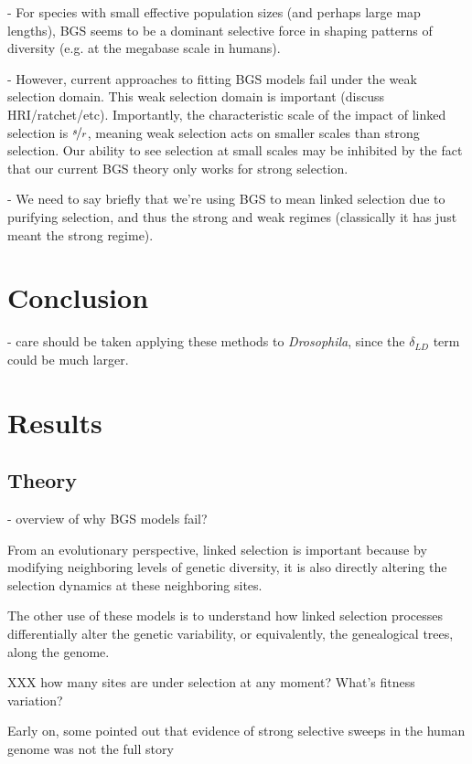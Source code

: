 \documentclass[11pt]{article}
\begin{document}
- For species with small effective population sizes (and perhaps large map
lengths), BGS seems to be a dominant selective force in shaping patterns of
diversity (e.g. at the megabase scale in humans).

- However, current approaches to fitting BGS models fail under the weak
selection domain. This weak selection domain is important (discuss
HRI/ratchet/etc). Importantly, the characteristic scale of the impact of linked
selection is $\nicefrac{s}{r}$, meaning weak selection acts on smaller scales
than strong selection. Our ability to see selection at small scales may be
inhibited by the fact that our current BGS theory only works for strong
selection.

- We need to say briefly that we're using BGS to mean linked selection due to
purifying selection, and thus the strong and weak regimes (classically it has
just meant the strong regime).

\section*{Conclusion}

- care should be taken applying these methods to \emph{Drosophila}, since the
$\delta_{LD}$ term could be much larger.

\section*{Results}

\subsection*{Theory}

- overview of why BGS models fail?


From an evolutionary perspective, linked selection is important because by
modifying neighboring levels of genetic diversity, it is also directly altering
the selection dynamics at these neighboring sites. 


The other use of these models is to understand how linked selection processes
differentially alter the genetic variability, or equivalently, the genealogical
trees, along the genome. 

XXX how many sites are under selection at any moment? What's fitness variation?



Early on, some pointed out that evidence of strong selective sweeps in the
human genome was not the full story 
\end{document}
